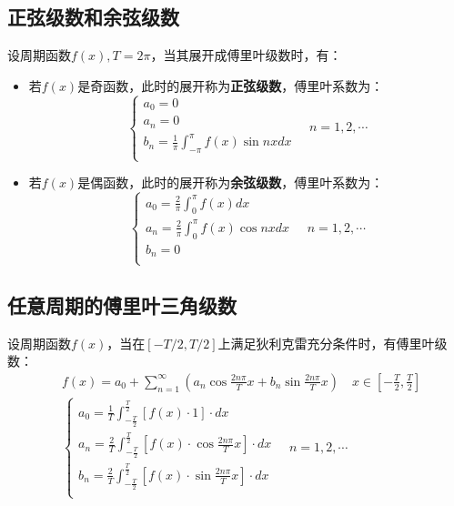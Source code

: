 \subsection{正弦级数和余弦级数}

\begin{definition}
设周期函数$f\left( x \right) ,T=2\pi $，当其展开成傅里叶级数时，有：
\begin{itemize}
    \item 若$f\left( x \right) $是奇函数，此时的展开称为{\bf 正弦级数}，傅里叶系数为：
    \[
    \begin{cases}
        a_0=0\\
        a_n=0\\
        b_n=\frac{1}{\pi}\int_{-\pi}^{\pi}{f\left( x \right) \sin nxdx}\\
    \end{cases} \quad n=1,2,\cdots
    \]
    \item 若$f\left( x \right) $是偶函数，此时的展开称为{\bf 余弦级数}，傅里叶系数为：
    \[
    \begin{cases}
        a_0=\frac{2}{\pi}\int_0^{\pi}{f\left( x \right) dx}\\
        a_n=\frac{2}{\pi}\int_0^{\pi}{f\left( x \right) \cos nxdx}\\
        b_n=0\\
    \end{cases} \quad n=1,2,\cdots
    \]
\end{itemize}
\end{definition}

\subsection{任意周期的傅里叶三角级数}

\begin{theorem}
设周期函数$f\left( x \right) $，当在$\left[ -T/2,T/2 \right] $上满足狄利克雷充分条件时，有傅里叶级数：
\begin{align*}
&f\left( x \right) =a_0+\sum_{n=1}^{\infty}{\left( a_n\cos \frac{2n\pi}{T}x+b_n\sin \frac{2n\pi}{T}x \right)} \quad x\in \left[ -\frac{T}{2},\frac{T}{2} \right] \\
&\begin{cases}
	a_0=\frac{1}{T}\int_{-\frac{T}{2}}^{\frac{T}{2}}{\left[ f\left( x \right) \cdot 1 \right] \cdot dx}\\
	a_n=\frac{2}{T}\int_{-\frac{T}{2}}^{\frac{T}{2}}{\left[ f\left( x \right) \cdot \cos \frac{2n\pi}{T}x \right] \cdot dx}\\
	b_n=\frac{2}{T}\int_{-\frac{T}{2}}^{\frac{T}{2}}{\left[ f\left( x \right) \cdot \sin \frac{2n\pi}{T}x \right] \cdot dx}\\
\end{cases} \quad n=1,2,\cdots
\end{align*}
\end{theorem}


